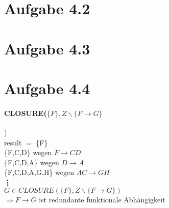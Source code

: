 \documentclass{article}
\begin{document}
		\pagebreak
	
	\section*{Aufgabe 4.2}
		
		
		
	\section*{Aufgabe 4.3}
		
		
	\section*{Aufgabe 4.4}
		\paragraph*{CLOSURE($\{ F \}, Z\backslash\{F \longrightarrow G\}$})\\
		result $=$ \{F\}\\
		
			\{F,C,D\} \hspace*{42mm} wegen $F \rightarrow CD$\\
			
			\{F,C,D,A\} \hspace*{39mm} wegen $D \rightarrow A$\\
			
			\{F,C,D,A,G,H\} \hspace*{32mm} wegen $AC \rightarrow GH$\\
			
			\hspace*{11mm}\textbf{\vdots}\\[1.2em]
			$G \in CLOSURE(\{F\}, Z \backslash \{F \longrightarrow G\})$\\
			$\Rightarrow F \rightarrow G$ ist redundante funktionale Abhängigkeit
	
	
	
\end{document}
